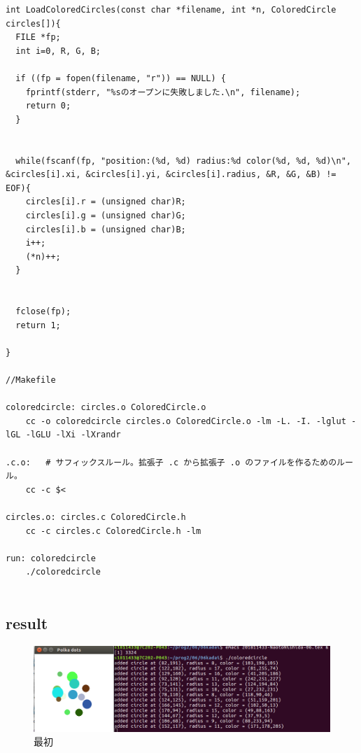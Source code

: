 \documentclass[10pt,a4paper]{jsarticle}
\begin{document}
\begin{lstlisting}[basicstyle=\ttfamily\footnotesize,frame=single,breaklines=true]
int LoadColoredCircles(const char *filename, int *n, ColoredCircle circles[]){
  FILE *fp;
  int i=0, R, G, B;

  if ((fp = fopen(filename, "r")) == NULL) {
    fprintf(stderr, "%sのオープンに失敗しました.\n", filename);
    return 0;
  }


  while(fscanf(fp, "position:(%d, %d) radius:%d color(%d, %d, %d)\n", &circles[i].xi, &circles[i].yi, &circles[i].radius, &R, &G, &B) != EOF){
    circles[i].r = (unsigned char)R;
    circles[i].g = (unsigned char)G;
    circles[i].b = (unsigned char)B;
    i++;
    (*n)++;
  }


  fclose(fp);
  return 1;

}

//Makefile

coloredcircle: circles.o ColoredCircle.o
	cc -o coloredcircle circles.o ColoredCircle.o -lm -L. -I. -lglut -lGL -lGLU -lXi -lXrandr

.c.o:	# サフィックスルール。拡張子 .c から拡張子 .o のファイルを作るためのルール。
	cc -c $<

circles.o: circles.c ColoredCircle.h
	cc -c circles.c ColoredCircle.h -lm

run: coloredcircle
	./coloredcircle
     
\end{lstlisting}

\subsection{result}

\begin{figure}[h]
  \includegraphics[width=0.8\linewidth]{a.png}
  \caption{最初}
  \label{fig:sutehage}

\end{figure}
\end{document}
